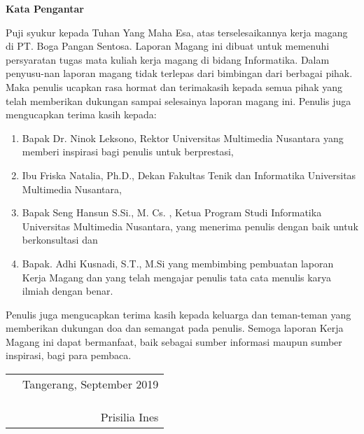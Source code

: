 \begin{center}
    \textbf{Kata Pengantar}
\end{center}


Puji syukur kepada Tuhan Yang Maha Esa, atas terselesaikannya kerja magang di PT. Boga Pangan Sentosa. 
Laporan Magang ini dibuat untuk memenuhi persyaratan tugas mata kuliah kerja magang di bidang Informatika. 
Dalam penyusu-\newline nan laporan magang tidak terlepas dari bimbingan dari berbagai pihak. 
Maka penulis ucapkan rasa hormat dan terimakasih kepada semua pihak yang telah 
memberikan dukungan sampai selesainya laporan magang ini.
Penulis juga mengucapkan terima kasih kepada:
\begin{enumerate}
    \item Bapak Dr. Ninok Leksono, Rektor Universitas Multimedia Nusantara yang memberi inspirasi bagi penulis untuk berprestasi,
    \item Ibu Friska Natalia, Ph.D., Dekan Fakultas Tenik dan Informatika Universitas Multimedia Nusantara,
    \item Bapak Seng Hansun S.Si., M. Cs. , Ketua Program Studi Informatika Universitas Multimedia Nusantara, yang menerima penulis dengan baik untuk berkonsultasi dan
    \item Bapak. Adhi Kusnadi, S.T., M.Si yang membimbing pembuatan laporan Kerja Magang dan yang telah mengajar penulis tata cata menulis karya ilmiah dengan benar.
\end{enumerate}
    Penulis juga mengucapkan terima kasih kepada keluarga dan teman-teman yang memberikan dukungan doa dan semangat pada penulis.
Semoga laporan Kerja Magang ini dapat bermanfaat, baik sebagai sumber informasi maupun sumber inspirasi, bagi para pembaca.

\begin{tabular}{p{7.5cm}r}
&Tangerang, September 2019\\
&\\
&\\
&\\
&{Prisilia Ines}
\end{tabular}